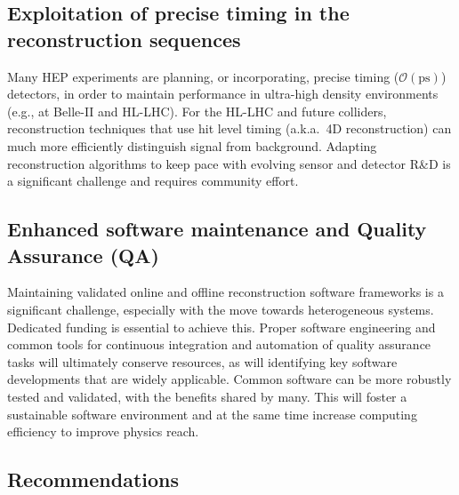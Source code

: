 \documentclass[10pt,a4paper]{article}
\begin{document}
\subsection{Exploitation of precise timing in the reconstruction
sequences}\label{exploitation-of-precise-timing-in-the-reconstruction-sequences}

Many HEP experiments are planning, or incorporating, precise timing
($\mathcal{O}(\mathrm{ps})$) detectors, in order to maintain performance in
ultra-high density environments (e.g., at Belle-II and HL-LHC). For the HL-LHC
and future colliders, reconstruction techniques that use hit level timing
(a.k.a.~4D reconstruction) can much more efficiently distinguish signal from
background. Adapting reconstruction algorithms to keep pace with evolving sensor
and detector R\&D is a significant challenge and requires community effort.

\subsection{Enhanced software maintenance and Quality Assurance
(QA)}\label{enhanced-software-maintenance-and-quality-assurance-qa}

Maintaining validated online and offline reconstruction software frameworks is a
significant challenge, especially with the move towards heterogeneous systems.
Dedicated funding is essential to achieve this. Proper software engineering and
common tools for continuous integration and automation of quality assurance
tasks will ultimately conserve resources, as will identifying key software
developments that are widely applicable. Common software can be more robustly
tested and validated, with the benefits shared by many. This will foster a
sustainable software environment and at the same time increase computing
efficiency to improve physics reach.

\subsection{Recommendations}\label{recommendations-2}
\end{document}
